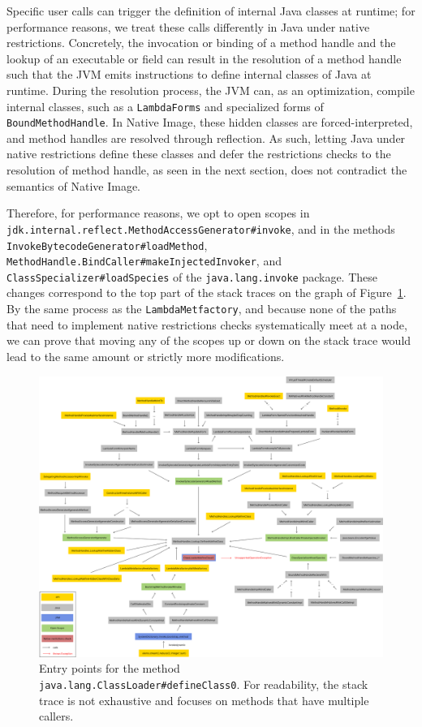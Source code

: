 Specific user calls can trigger the definition of internal Java classes at runtime; for performance reasons, we treat these calls differently in Java under native restrictions.
Concretely, the invocation or binding of a method handle and the lookup of an executable or field can result in the resolution of a method handle such that the JVM emits instructions to define internal classes of Java at runtime. During the resolution process, the JVM can, as an optimization, compile internal classes, such as a \verb|LambdaForms| and specialized forms of \verb|BoundMethodHandle|.
In Native Image, these hidden classes are forced-interpreted, and method handles are resolved through reflection. As such, letting Java under native restrictions define these classes and defer the restrictions checks to the resolution of method handle, as seen in the next section, does not contradict the semantics of Native Image. 

Therefore, for performance reasons, we opt to open scopes in \verb|jdk.internal.reflect.MethodAccessGenerator#invoke|, and in the methods \verb|InvokeBytecodeGenerator#loadMethod|, \verb|MethodHandle.BindCaller#makeInjectedInvoker|, and \verb|ClassSpecializer#loadSpecies| of the \verb|java.lang.invoke| package. These changes correspond to the top part of the stack traces on the graph of Figure~\ref{fig:define_class_0}. By the same process as the \verb|LambdaMetfactory|, and because none of the paths that need to implement native restrictions checks systematically meet at a node, we can prove that moving any of the scopes up or down on the stack trace would lead to the same amount or strictly more modifications.

\begin{figure}
    \centering
    \includegraphics[angle=90,origin=c,scale=0.35]{resources/Group 413.png}
    \caption{Entry points for the method \texttt{java.lang.ClassLoader\#defineClass0}. For readability, the stack trace is not exhaustive and focuses on methods that have multiple callers.}
    \label{fig:define_class_0}
\end{figure}

